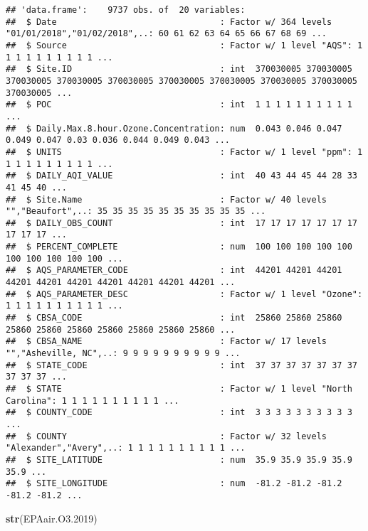 \documentclass[]{article}
\newenvironment{Shaded}{\begin{snugshade}}{\end{snugshade}}
\newcommand{\FloatTok}[1]{\textcolor[rgb]{0.00,0.00,0.81}{#1}}
\newcommand{\KeywordTok}[1]{\textcolor[rgb]{0.13,0.29,0.53}{\textbf{#1}}}
\newcommand{\NormalTok}[1]{#1}
\begin{document}
\begin{verbatim}
## 'data.frame':    9737 obs. of  20 variables:
##  $ Date                                : Factor w/ 364 levels "01/01/2018","01/02/2018",..: 60 61 62 63 64 65 66 67 68 69 ...
##  $ Source                              : Factor w/ 1 level "AQS": 1 1 1 1 1 1 1 1 1 1 ...
##  $ Site.ID                             : int  370030005 370030005 370030005 370030005 370030005 370030005 370030005 370030005 370030005 370030005 ...
##  $ POC                                 : int  1 1 1 1 1 1 1 1 1 1 ...
##  $ Daily.Max.8.hour.Ozone.Concentration: num  0.043 0.046 0.047 0.049 0.047 0.03 0.036 0.044 0.049 0.043 ...
##  $ UNITS                               : Factor w/ 1 level "ppm": 1 1 1 1 1 1 1 1 1 1 ...
##  $ DAILY_AQI_VALUE                     : int  40 43 44 45 44 28 33 41 45 40 ...
##  $ Site.Name                           : Factor w/ 40 levels "","Beaufort",..: 35 35 35 35 35 35 35 35 35 35 ...
##  $ DAILY_OBS_COUNT                     : int  17 17 17 17 17 17 17 17 17 17 ...
##  $ PERCENT_COMPLETE                    : num  100 100 100 100 100 100 100 100 100 100 ...
##  $ AQS_PARAMETER_CODE                  : int  44201 44201 44201 44201 44201 44201 44201 44201 44201 44201 ...
##  $ AQS_PARAMETER_DESC                  : Factor w/ 1 level "Ozone": 1 1 1 1 1 1 1 1 1 1 ...
##  $ CBSA_CODE                           : int  25860 25860 25860 25860 25860 25860 25860 25860 25860 25860 ...
##  $ CBSA_NAME                           : Factor w/ 17 levels "","Asheville, NC",..: 9 9 9 9 9 9 9 9 9 9 ...
##  $ STATE_CODE                          : int  37 37 37 37 37 37 37 37 37 37 ...
##  $ STATE                               : Factor w/ 1 level "North Carolina": 1 1 1 1 1 1 1 1 1 1 ...
##  $ COUNTY_CODE                         : int  3 3 3 3 3 3 3 3 3 3 ...
##  $ COUNTY                              : Factor w/ 32 levels "Alexander","Avery",..: 1 1 1 1 1 1 1 1 1 1 ...
##  $ SITE_LATITUDE                       : num  35.9 35.9 35.9 35.9 35.9 ...
##  $ SITE_LONGITUDE                      : num  -81.2 -81.2 -81.2 -81.2 -81.2 ...
\end{verbatim}

\begin{Shaded}
\begin{Highlighting}[]
\KeywordTok{str}\NormalTok{(EPAair.O3}\FloatTok{.2019}\NormalTok{)}
\end{Highlighting}
\end{Shaded}
\end{document}
